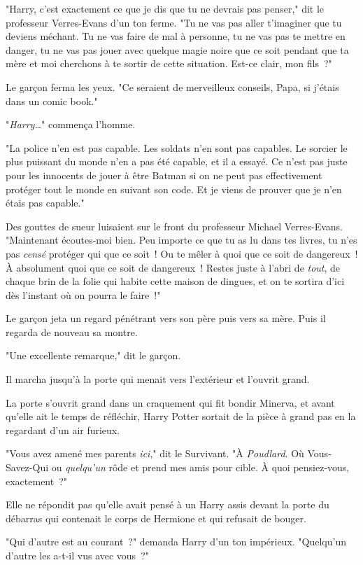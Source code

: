 "Harry, c'est exactement ce que je dis que tu ne devrais pas penser," dit le professeur Verres-Evans d'un ton ferme. "Tu ne vas pas aller t'imaginer que tu deviens méchant. Tu ne vas faire de mal à personne, tu ne vas pas te mettre en danger, tu ne vas pas jouer avec quelque magie noire que ce soit pendant que ta mère et moi cherchons à te sortir de cette situation. Est-ce clair, mon fils~?"

Le garçon ferma les yeux. "Ce seraient de merveilleux conseils, Papa, si j'étais dans un comic book."

"\emph{Harry…}" commença l'homme.

"La police n'en est pas capable. Les soldats n'en sont pas capables. Le sorcier le plus puissant du monde n'en a pas été capable, et il a essayé. Ce n'est pas juste pour les innocents de jouer à être Batman si on ne peut pas effectivement protéger tout le monde en suivant son code. Et je viens de prouver que je n'en étais pas capable."

Des gouttes de sueur luisaient sur le front du professeur Michael Verres-Evans. "Maintenant écoutes-moi bien. Peu importe ce que tu as lu dans tes livres, tu n'es pas \emph{censé} protéger qui que ce soit~! Ou te mêler à quoi que ce soit de dangereux~! À absolument quoi que ce soit de dangereux~! Restes juste à l'abri de \emph{tout}, de chaque brin de la folie qui habite cette maison de dingues, et on te sortira d'ici dès l'instant où on pourra le faire~!"

Le garçon jeta un regard pénétrant vers son père puis vers sa mère. Puis il regarda de nouveau sa montre.

"Une excellente remarque," dit le garçon.

Il marcha jusqu'à la porte qui menait vers l'extérieur et l'ouvrit grand.

\later

La porte s'ouvrit grand dans un craquement qui fit bondir Minerva, et avant qu'elle ait le temps de réfléchir, Harry Potter sortait de la pièce à grand pas en la regardant d'un air furieux.

"Vous avez amené mes parents \emph{ici}," dit le Survivant. "À \emph{Poudlard}. Où Vous-Savez-Qui ou \emph{quelqu'un} rôde et prend mes amis pour cible. À quoi pensiez-vous, exactement~?"

Elle ne répondit pas qu'elle avait pensé à un Harry assis devant la porte du débarras qui contenait le corps de Hermione et qui refusait de bouger.

"Qui d'autre est au courant~?" demanda Harry d'un ton impérieux. "Quelqu'un d'autre les a-t-il vus avec vous~?"

